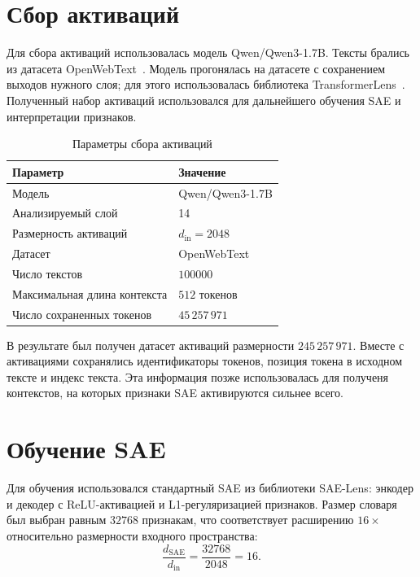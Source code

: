 \documentclass[a4paper,14pt]{extreport}
\begin{document}
\section{Сбор активаций}

Для сбора активаций использовалась модель Qwen/Qwen3-1.7B. Тексты брались из
датасета OpenWebText~\cite{openwebtext_corpus}. 
Модель прогонялась на датасете с сохранением выходов нужного слоя; для этого
использовалась библиотека TransformerLens~\cite{transformer_lens}. Полученный
набор активаций использовался для дальнейшего обучения SAE и интерпретации
признаков. 

\begin{table}[H]
    \centering
    \small
    \caption{Параметры сбора активаций}
    \label{tab:activation_collection}
    \begin{tabular}{p{}p{}}
        \toprule
        Параметр & Значение \\
        \midrule
        Модель & Qwen/Qwen3-1.7B \\
        Анализируемый слой & 14 \\
        Размерность активаций & $d_{\mathrm{in}} = 2048$ \\
        Датасет & OpenWebText \\
        Число текстов & $100000$ \\
        Максимальная длина контекста & $512$ токенов \\
        Число сохраненных токенов & $45\,257\,971$ \\
        \bottomrule
    \end{tabular}
\end{table}

В результате был получен датасет активаций размерности
$245\,257\,971$. Вместе с активациями сохранялись идентификаторы
токенов, позиция токена в исходном тексте и индекс текста. Эта информация
позже использовалась для полученя контекстов, на которых признаки SAE
активируются сильнее всего.

\section{Обучение SAE}

Для обучения использовался стандартный SAE из библиотеки SAE-Lens:
энкодер и декодер с ReLU-активацией и L1-регуляризацией признаков. Размер словаря
был выбран равным $32768$ признакам, что соответствует расширению $16\times$
относительно размерности входного пространства:
\begin{equation}
    \frac{d_{\mathrm{SAE}}}{d_{\mathrm{in}}}
    =
    \frac{32768}{2048}
    =
    16.
\end{equation}
\end{document}

